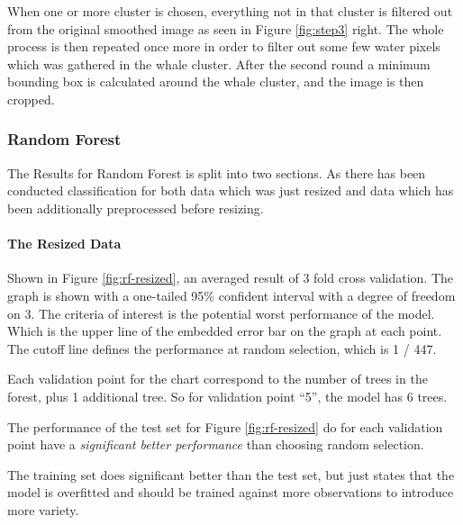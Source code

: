When one or more cluster is chosen, everything not in that cluster is filtered out from the original smoothed image as seen in Figure \ref{fig:step3} right. The whole process is then repeated once more in order to filter out some few water pixels which was gathered in the whale cluster.
After the second round a minimum bounding box is calculated around the whale cluster, and the image is then cropped.



\subsubsection{Random Forest}
The Results for Random Forest is split into two sections. As there has been conducted classification for both data which was just resized and data which has been additionally preprocessed before resizing.

\paragraph{The Resized Data}
\label{par:rf-resized}
Shown in Figure \ref{fig:rf-resized}, an averaged result of 3 fold cross validation. The graph is shown with a one-tailed 95\% confident interval with a degree of freedom on 3. The criteria of interest is the potential worst performance of the model. Which is the upper line of the embedded error bar on the graph at each point. The cutoff line defines the performance at random selection, which is 1 / 447. 

Each validation point for the chart correspond to the number of trees in the forest, plus 1 additional tree. So for validation point ``5'', the model has 6 trees.

The performance of the test set for Figure \ref{fig:rf-resized} do for each validation point have a \emph{significant better performance} than choosing random selection.

The training set does significant better than the test set, but just states that the model is overfitted and should be trained against more observations to introduce more variety.

